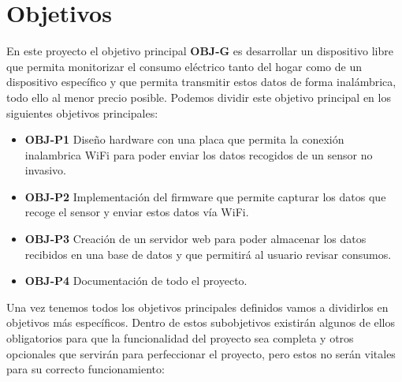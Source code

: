 \chapter{Objetivos}

En este proyecto el objetivo principal \textbf{OBJ-G} es desarrollar un dispositivo libre que permita monitorizar el consumo eléctrico tanto del hogar como de un dispositivo específico y que permita transmitir estos datos de forma inalámbrica, todo ello al menor precio posible.
Podemos dividir este objetivo principal en los siguientes objetivos principales:

\begin{itemize}
	\item\textbf{OBJ-P1} Diseño hardware con una placa que permita la conexión inalambrica WiFi para poder enviar los datos recogidos de un sensor no invasivo.
	
	\item\textbf{OBJ-P2} Implementación del firmware que permite capturar los datos que recoge el sensor y enviar estos datos vía WiFi.
	
	\item\textbf{OBJ-P3} Creación de un servidor web para poder almacenar los datos recibidos en una base de datos y que permitirá al usuario revisar consumos.
	
	\item\textbf{OBJ-P4} Documentación de todo el proyecto.
	
	
\end{itemize}

Una vez tenemos todos los objetivos principales definidos vamos a dividirlos en objetivos más específicos. Dentro de estos subobjetivos existirán algunos de ellos obligatorios para que la funcionalidad del proyecto sea completa y otros opcionales que servirán para perfeccionar el proyecto, pero estos no serán vitales para su correcto funcionamiento:

